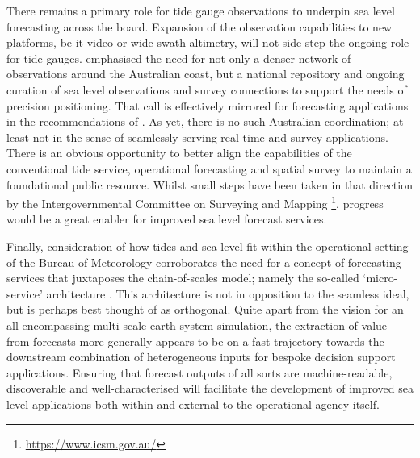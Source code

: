 There remains a primary role for tide gauge observations to underpin sea level forecasting across the board.
Expansion of the observation capabilities to new platforms, be it video \citep{10.1175/jtech-d-18-0203.1} or wide swath altimetry, will not side-step the ongoing role for tide gauges.
\citep{Keysers:we} emphasised the need for not only a denser network of observations around the Australian coast, but a national repository and ongoing curation of sea level observations and survey connections to support the needs of precision positioning.   
That call is effectively mirrored for forecasting applications in the recommendations of \citep{10.1175/bams-89-4-459}.
As yet, there is no such Australian coordination; at least not in the sense of seamlessly serving real-time and survey applications.
There is an obvious opportunity to better align the capabilities of the conventional tide service, operational forecasting and spatial survey to maintain a foundational public resource.  Whilst small steps have been taken in that direction by the Intergovernmental Committee on Surveying and Mapping \footnote{\url{https://www.icsm.gov.au/}}, progress would be a great enabler for improved sea level forecast services.





Finally, consideration of how tides and sea level fit within the operational setting of the Bureau of Meteorology corroborates the need for a concept of forecasting services that juxtaposes the chain-of-scales model; namely the so-called `micro-service' architecture \citep{BCG2020}.   This architecture is not in opposition to the seamless ideal, but is perhaps best thought of as orthogonal.  
Quite apart from the vision for an all-encompassing multi-scale earth system simulation, the extraction of value from forecasts more generally appears to be on a fast trajectory towards the downstream combination of heterogeneous inputs for bespoke decision support applications.  
Ensuring that forecast outputs of all sorts are machine-readable, discoverable and well-characterised will facilitate the development of improved sea level applications both within and external to the operational agency itself.    




